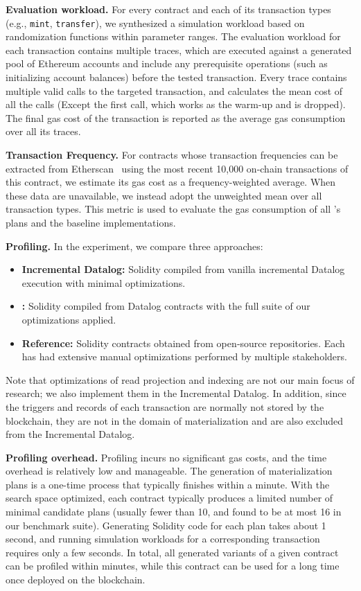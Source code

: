 \noindent\textbf{Evaluation workload.}
For every contract and each of its transaction types (e.g., \texttt{mint}, \texttt{transfer}), we synthesized a simulation workload based on randomization functions within parameter ranges.  
The evaluation workload for each transaction contains multiple traces, which are executed against a generated pool of Ethereum accounts and include any prerequisite operations (such as initializing account balances) before the tested transaction. Every trace contains multiple valid calls to the targeted transaction, and calculates the mean cost of all the calls (Except the first call, which works as the warm-up and is dropped).
The final gas cost of the transaction is reported as the average gas consumption over all its traces.


\noindent \textbf{Transaction Frequency.} 
For contracts whose transaction frequencies can be extracted from Etherscan~\cite{etherscan} using the most recent 10,000 on‑chain transactions of this contract, we estimate its gas cost as a frequency-weighted average. When these data are unavailable, we instead adopt the unweighted mean over all transaction types. 
This metric is used to evaluate the gas consumption of all \proto's plans and the baseline implementations.

\noindent \textbf{Profiling.} In the experiment, we compare three approaches:
\begin{itemize}
    \item \textbf{\sf Incremental Datalog:} Solidity compiled from vanilla incremental Datalog execution with minimal optimizations.
    \item {\bf \proto:} Solidity compiled from Datalog contracts with the full suite of our optimizations applied.
    \item \textbf{\sf Reference:} Solidity contracts obtained from open‑source repositories. Each has had extensive manual optimizations performed by multiple stakeholders.
\end{itemize}

Note that optimizations of read projection and indexing are not our main focus of research; we also implement them in the {\sf Incremental Datalog}. In addition, since the triggers and records of each transaction are normally not stored by the blockchain, they are not in the domain of materialization and are also excluded from the {\sf Incremental Datalog}.

\noindent \textbf{Profiling overhead.}
Profiling incurs no significant gas costs, and the time overhead is relatively low and manageable. The generation of materialization plans is a one-time process that typically finishes within a minute. With the search space optimized, each contract typically produces a limited number of minimal candidate plans (usually fewer than 10, and found to be at most 16 in our benchmark suite). Generating Solidity code for each plan takes about 1 second, and running simulation workloads for a corresponding transaction requires only a few seconds. In total, all generated variants of a given contract can be profiled within minutes, while this contract can be used for a long time once deployed on the blockchain.

